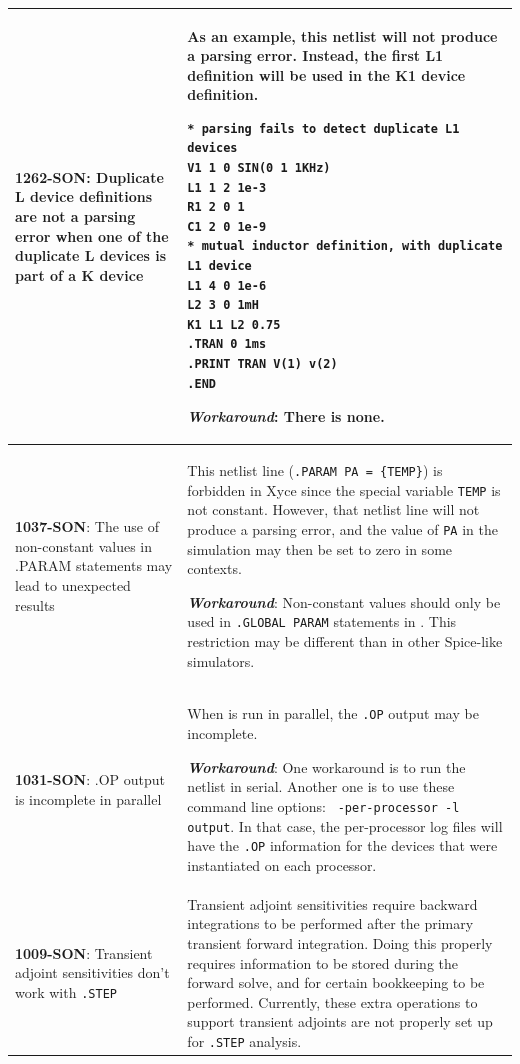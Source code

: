 {\begin{longtable}[h] {>{\raggedright\small}m{2in}|>{\raggedright\let\\\tabularnewline\small}m{3.5in}}
\textbf{1262-SON}: Duplicate L device definitions are not a parsing error
when one of the duplicate L devices is part of a K device &
As an example, this netlist will not produce a parsing error.  Instead,
the first L1 definition will be used in the K1 device definition.
\begin{verbatim}
* parsing fails to detect duplicate L1 devices
V1 1 0 SIN(0 1 1KHz)
L1 1 2 1e-3
R1 2 0 1
C1 2 0 1e-9
* mutual inductor definition, with duplicate L1 device
L1 4 0 1e-6
L2 3 0 1mH
K1 L1 L2 0.75
.TRAN 0 1ms
.PRINT TRAN V(1) v(2)
.END
\end{verbatim}

\textbf{\textit{Workaround}}:
There is none.
\\ \hline



\textbf{1037-SON}: The use of non-constant values in .PARAM
statements may lead to unexpected results &  This netlist line
(\texttt{.PARAM PA = \{TEMP\}}) is forbidden in Xyce since
the special variable \texttt{TEMP} is not constant.  However,
that netlist line will not produce a \Xyce{} parsing error, and
the value of \texttt{PA} in the simulation may then be set to 
zero in some contexts.

\textbf{\textit{Workaround}}: Non-constant values should only
be used in \texttt{.GLOBAL PARAM} statements in \Xyce{}. This
restriction may be different than in other Spice-like 
simulators.
\\ \hline

\textbf{1031-SON}: .OP output is incomplete in parallel & When \Xyce{}
is run in parallel, the \texttt{.OP} output may be incomplete. 

\textbf{\textit{Workaround}}: One workaround is to run the netlist in 
serial.  Another one is to use these command line options: \texttt{
-per-processor -l output}.  In that case, the per-processor log files 
will have the \texttt{.OP} information for the devices that were 
instantiated on each processor.
\\ \hline 

  \textbf{1009-SON}:  Transient adjoint sensitivities don't work with \texttt{.STEP}
  & Transient adjoint sensitivities require backward integrations to be performed after the primary transient forward integration.  Doing this properly requires information to be stored during the forward solve, and for certain bookkeeping to be performed.  Currently, these extra operations to support transient adjoints are not properly set up for \texttt{.STEP} analysis.


\end{longtable}}
